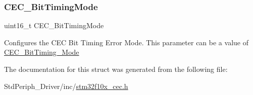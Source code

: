 \subsubsection{\texorpdfstring{CEC\_BitTimingMode}{CEC\_BitTimingMode}}
{\footnotesize\ttfamily uint16\+\_\+t C\+E\+C\+\_\+\+Bit\+Timing\+Mode}

Configures the C\+EC Bit Timing Error Mode. This parameter can be a value of \mbox{\hyperlink{group___c_e_c___bit_timing___mode}{C\+E\+C\+\_\+\+Bit\+Timing\+\_\+\+Mode}} 

The documentation for this struct was generated from the following file\+:\begin{DoxyCompactItemize}
\item 
Std\+Periph\+\_\+\+Driver/inc/\mbox{\hyperlink{stm32f10x__cec_8h}{stm32f10x\+\_\+cec.\+h}}\end{DoxyCompactItemize}
